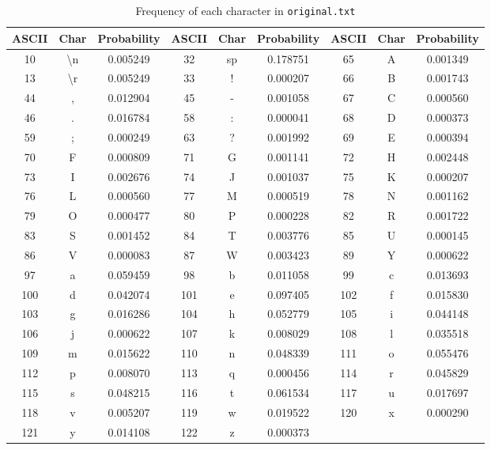 \documentclass[12pt,twoside]{article}
\begin{document}
\begin{appendices}
\begin{longtable}{ccc||ccc||ccc}
    \caption{Frequency of each character in \texttt{original.txt}}
    \label{tab:originalStat} \\
    \toprule
    \textbf{ASCII} & \textbf{Char} & \textbf{Probability} & \textbf{ASCII} & \textbf{Char} & \textbf{Probability} & \textbf{ASCII} & \textbf{Char} & \textbf{Probability} \\ \hline
    \endfirsthead
    10 & \textbackslash n & 0.005249 & 32 & sp & 0.178751 & 65 & A & 0.001349 \\
    13 & \textbackslash r & 0.005249 & 33 & ! & 0.000207 & 66 & B & 0.001743 \\
    44 & , & 0.012904 & 45 & - & 0.001058 & 67 & C & 0.000560 \\
    46 & . & 0.016784 & 58 & : & 0.000041 & 68 & D & 0.000373 \\
    59 & ; & 0.000249 & 63 & ? & 0.001992 & 69 & E & 0.000394 \\
    70 & F & 0.000809 & 71 & G & 0.001141 & 72 & H & 0.002448 \\
    73 & I & 0.002676 & 74 & J & 0.001037 & 75 & K & 0.000207 \\
    76 & L & 0.000560 & 77 & M & 0.000519 & 78 & N & 0.001162 \\
    79 & O & 0.000477 & 80 & P & 0.000228 & 82 & R & 0.001722 \\
    83 & S & 0.001452 & 84 & T & 0.003776 & 85 & U & 0.000145 \\
    86 & V & 0.000083 & 87 & W & 0.003423 & 89 & Y & 0.000622 \\
    97 & a & 0.059459 & 98 & b & 0.011058 & 99 & c & 0.013693 \\
    100 & d & 0.042074 & 101 & e & 0.097405 & 102 & f & 0.015830 \\
    103 & g & 0.016286 & 104 & h & 0.052779 & 105 & i & 0.044148 \\
    106 & j & 0.000622 & 107 & k & 0.008029 & 108 & l & 0.035518 \\
    109 & m & 0.015622 & 110 & n & 0.048339 & 111 & o & 0.055476 \\
    112 & p & 0.008070 & 113 & q & 0.000456 & 114 & r & 0.045829 \\
    115 & s & 0.048215 & 116 & t & 0.061534 & 117 & u & 0.017697 \\
    118 & v & 0.005207 & 119 & w & 0.019522 & 120 & x & 0.000290 \\
    121 & y & 0.014108 & 122 & z & 0.000373 &  &  &  \\
    \bottomrule
\end{longtable}


\end{appendices}
\end{document}
